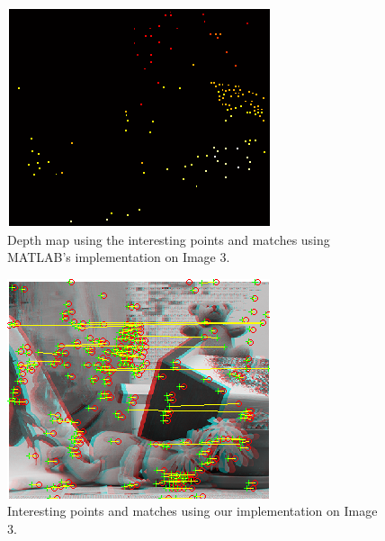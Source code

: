 \begin{figure}[H]\centering
	\includegraphics[width=0.8\linewidth]{Images/03_matlab_depth.png}
	\caption{Depth map using the interesting points and matches using MATLAB's implementation on Image 3.}
	\label{fig:grid-example}
\end{figure}

\begin{figure}[H]\centering
	\includegraphics[width=0.8\linewidth]{Images/03_our_match.png}
	\caption{Interesting points and matches using our implementation on Image 3.}
	\label{fig:grid-example}
\end{figure}

